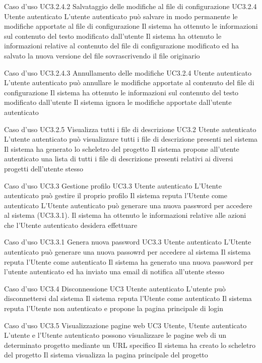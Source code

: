 \UCtitle
{Caso d'uso UC3.2.4.2}
{Salvataggio delle modifiche al file di configurazione}
\UC
{UC3.2.4}
{Utente autenticato}
{L'utente autenticato può salvare in modo permanente le modifiche apportate al file di configurazione}
{Il sistema ha ottenuto le informazioni sul contenuto del testo modificato dall'utente}
\post
{Il sistema ha ottenuto le informazioni relative al contenuto del file di configurazione modificato ed ha salvato la nuova versione del file sovrascrivendo il file originario}

\UCtitle
{Caso d'uso UC3.2.4.3}
{Annullamento delle modifiche}
\UC
{UC3.2.4}
{Utente autenticato}
{L'utente autenticato può annullare le modifiche apportate al contenuto del file di configurazione}
{Il sistema ha ottenuto le informazioni sul contenuto del testo modificato dall'utente}
\post
{Il sistema ignora le modifiche apportate dall'utente autenticato}

\UCtitle
{Caso d'uso UC3.2.5}
{Visualizza tutti i file di descrizione}
\UC
{UC3.2}
{Utente autenticato}
{L'utente autenticato può visualizzare tutti i file di descrizione presenti nel sistema}
{Il sistema ha generato lo scheletro del progetto}
\post
{Il sistema propone all'utente autenticato una lista di tutti i file di descrizione presenti relativi ai diversi progetti dell'utente stesso}


\UCtitle
{Caso d'uso UC3.3}
{Gestione profilo}
\UC
{UC3.3}
{Utente autenticato}
{L'Utente autenticato può gestire il proprio profilo}
{Il sistema reputa l'Utente come autenticato}
\scenario
{L'Utente autenticato può generare una nuova password per accedere al sistema (UC3.3.1).}
\post
{Il sistema ha ottenuto le informazioni relative alle azioni che l'Utente autenticato desidera effettuare}

\UCtitle
{Caso d'uso UC3.3.1}
{Genera nuova password}
\UC
{UC3.3}
{Utente autenticato}
{L'Utente autenticato può generare una nuova passowrd per accedere al sistema}
{Il sistema reputa l'Utente come autenticato}
\post
{Il sistema ha generato una nuova password per l'utente autenticato ed ha inviato una email di notifica all'utente stesso}

\UCtitle
{Caso d'uso UC3.4}
{Disconnessione}
\UC
{UC3}
{Utente autenticato}
{L'utente può disconnettersi dal sistema}
{Il sistema reputa l'Utente come autenticato}
\post
{Il sistema reputa l'Utente non autenticato e propone la pagina principale di login}


\UCtitle
{Caso d'uso UC3.5}
{Visualizzazione pagine web}
\UC
{UC3}
{Utente, Utente autenticato}
{L'utente e l'Utente autenticato possono visualizzare le pagine web di un determinato progetto mediante un URL specifico}
{Il sistema ha creato lo scheletro del progetto}
\post
{Il sistema visualizza la pagina principale del progetto}



